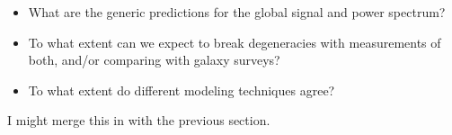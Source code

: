 \documentclass[letterpaper,titlepage,12pt]{article}
\begin{document}
\begin{itemize}
    \item What are the generic predictions for the global signal and power spectrum?
    \item To what extent can we expect to break degeneracies with measurements of both, and/or comparing with galaxy surveys?
    \item To what extent do different modeling techniques agree?
\end{itemize}

I might merge this in with the previous section. 




%
%
\end{document}
